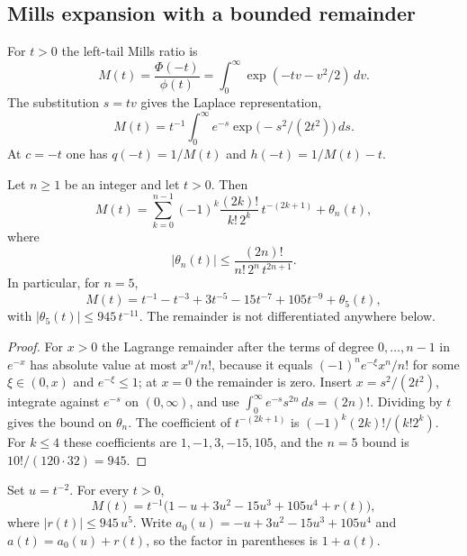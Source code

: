 \subsection{Mills expansion with a bounded remainder}\label{sc:sub3}

For \(t>0\) the left-tail Mills ratio is
\[
M(t)=\frac{\Phi(-t)}{\phi(t)}=\int_0^\infty\exp(-tv-v^2/2)\,dv.
\]
The substitution \(s=tv\) gives the Laplace representation,
\[
M(t)=t^{-1}\int_0^\infty e^{-s}\exp\bigl(-s^2/(2t^2)\bigr)\,ds.
\]
At \(c=-t\) one has \(q(-t)=1/M(t)\) and \(h(-t)=1/M(t)-t\).

\begin{lemma}\label{sc:lemma3.1}
Let \(n\ge1\) be an integer and let \(t>0\). Then
\[
M(t)=\sum_{k=0}^{n-1}(-1)^k\frac{(2k)!}{k!\,2^k}\,t^{-(2k+1)}+\theta_n(t),
\]
where
\[
|\theta_n(t)|\le\frac{(2n)!}{n!\,2^n\,t^{2n+1}}.
\]
In particular, for \(n=5\),
\[
M(t)=t^{-1}-t^{-3}+3t^{-5}-15t^{-7}+105t^{-9}+\theta_5(t),
\]
with \(|\theta_5(t)|\le 945\,t^{-11}\). The remainder is not differentiated anywhere below.

\end{lemma}
\begin{proof}
For \(x>0\) the Lagrange remainder after the terms of degree \(0,\ldots,n-1\) in \(e^{-x}\) has absolute value at most \(x^n/n!\), because it equals \((-1)^n e^{-\xi}x^n/n!\) for some \(\xi\in(0,x)\) and \(e^{-\xi}\le1\); at \(x=0\) the remainder is zero. Insert \(x=s^2/(2t^2)\), integrate against \(e^{-s}\) on \((0,\infty)\), and use \(\int_0^\infty e^{-s}s^{2n}\,ds=(2n)!\). Dividing by \(t\) gives the bound on \(\theta_n\). The coefficient of \(t^{-(2k+1)}\) is \((-1)^k(2k)!/(k!2^k)\). For \(k\le 4\) these coefficients are \(1,-1,3,-15,105\), and the \(n=5\) bound is \(10!/(120\cdot 32)=945\).

\end{proof}


Set \(u=t^{-2}\). For every \(t>0\),
\begin{equation}
\label{sc:M-factor}
M(t)=t^{-1}\bigl(1-u+3u^2-15u^3+105u^4+r(t)\bigr),
\end{equation}
where \(|r(t)|\le 945\,u^5\). Write \(a_0(u)=-u+3u^2-15u^3+105u^4\) and \(a(t)=a_0(u)+r(t)\), so the factor in parentheses is \(1+a(t)\).


